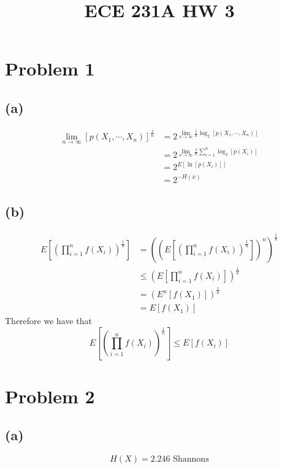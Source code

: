 
\title{ECE 231A HW 3}

\maketitle
\section*{Problem 1}
\subsection*{(a)}
\begin{align*}
    \lim_{n\to\infty}[p(X_1,\cdots,X_n)]^{\frac{1}{n}}&=
        2^{\lim_{n\to\infty}\frac{1}{n}\log_2[p(X_1,\cdots,X_n)]}\\
    &=2^{\lim_{n\to\infty}\frac{1}{n}\sum_{i=1}^n\log_2[p(X_i)]}\\
    &=2^{E[\ln[p(X_i)]]}\\
    &=\boxed{2^{-H(x)}}
\end{align*}
\subsection*{(b)}
\begin{align*}
    E\left[\left(\prod_{i=1}^nf(X_i)\right)^{\frac{1}{n}}\right]&=
        \left(\left(E\left[\left(\prod_{i=1}^nf(X_i)\right)^{\frac{1}{n}}\right]\right)^{n}\right)^{\frac{1}{n}}\\
        &\leq \left(E\left[\prod_{i=1}^nf(X_i)\right]\right)^{\frac{1}{n}}\\
        &=\left(E^n[f(X_1)]\right)^{\frac{1}{n}}\\
        &=E[f(X_1)]
\end{align*}
Therefore we have that
$$
    \boxed{E\left[\left(\prod_{i=1}^nf(X_i)\right)^{\frac{1}{n}}\right]\leq E[f(X_i)]}
    $$
\section*{Problem 2}
\subsection*{(a)}
$$H(X)=\boxed{2.246 \text{ Shannons}}$$
